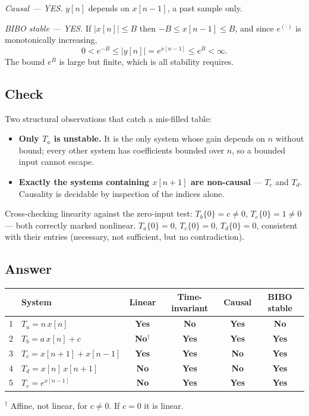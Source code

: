 \emph{Causal — YES.} $y[n]$ depends on $x[n-1]$, a past sample only.

\emph{BIBO stable — YES.} If $|x[n]| \le B$ then $-B \le x[n-1] \le B$, and since
$e^{(\cdot)}$ is monotonically increasing,
\begin{equation}
  0 < e^{-B} \le |y[n]| = e^{x[n-1]} \le e^{B} < \infty .
\end{equation}
The bound $e^B$ is large but finite, which is all stability requires.

\subsection*{Check}

Two structural observations that catch a mis-filled table:

\begin{itemize}
  \item \textbf{Only $T_a$ is unstable.} It is the only system whose gain depends
    on $n$ without bound; every other system has coefficients bounded over $n$,
    so a bounded input cannot escape.
  \item \textbf{Exactly the systems containing $x[n+1]$ are non-causal} — $T_c$
    and $T_d$. Causality is decidable by inspection of the indices alone.
\end{itemize}

Cross-checking linearity against the zero-input test: $T_b\{0\} = c \ne 0$,
$T_e\{0\} = 1 \ne 0$ — both correctly marked nonlinear. $T_a\{0\} = 0$,
$T_c\{0\} = 0$, $T_d\{0\} = 0$, consistent with their entries (necessary, not
sufficient, but no contradiction).

\subsection*{Answer}

\begin{answerbox}
\begin{center}
\begin{tabular}{clcccc}
  \toprule
  & System & Linear & Time-invariant & Causal & BIBO stable \\
  \midrule
  1 & $T_a = n\,x[n]$          & \textbf{Yes} & \textbf{No}  & \textbf{Yes} & \textbf{No}  \\
  2 & $T_b = a\,x[n] + c$      & \textbf{No}$^\dagger$ & \textbf{Yes} & \textbf{Yes} & \textbf{Yes} \\
  3 & $T_c = x[n+1] + x[n-1]$  & \textbf{Yes} & \textbf{Yes} & \textbf{No}  & \textbf{Yes} \\
  4 & $T_d = x[n]\,x[n+1]$     & \textbf{No}  & \textbf{Yes} & \textbf{No}  & \textbf{Yes} \\
  5 & $T_e = e^{x[n-1]}$       & \textbf{No}  & \textbf{Yes} & \textbf{Yes} & \textbf{Yes} \\
  \bottomrule
\end{tabular}
\end{center}
\vspace{2pt}
{\footnotesize $^\dagger$ Affine, not linear, for $c \ne 0$. If $c = 0$ it is linear.}
\end{answerbox}


